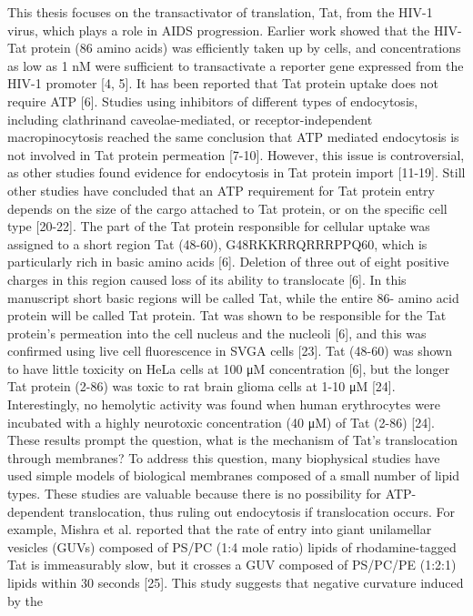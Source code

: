 This thesis focuses on 
the transactivator of translation, Tat, from the HIV-1 virus, which plays a 
role in AIDS progression. Earlier work showed that the HIV-Tat 
protein (86 amino acids) was efficiently taken up by cells, and concentrations 
as low as 1 nM were sufficient to transactivate a reporter gene expressed from 
the HIV-1 promoter [4, 5]. It has been reported that Tat protein uptake does not 
require ATP [6]. Studies using inhibitors of different types of endocytosis, 
including clathrinand caveolae-mediated, or receptor-independent 
macropinocytosis reached the same conclusion that ATP mediated endocytosis is 
not involved in Tat protein permeation [7-10]. However, this issue is 
controversial, as other studies found evidence for endocytosis in Tat protein 
import [11-19]. Still other studies have concluded that an ATP requirement for 
Tat protein entry depends on the size of the cargo attached to Tat protein, or 
on the specific cell type [20-22]. The part of the Tat protein responsible for 
cellular uptake was assigned to a short region Tat (48-60), G48RKKRRQRRRPPQ60, 
which is particularly rich in basic amino acids [6]. Deletion of three out of 
eight positive charges in this region caused loss of its ability to translocate 
[6]. In this manuscript short basic regions will be called Tat, while the 
entire 86-
amino acid protein will be called Tat protein. Tat was shown to be responsible 
for the Tat
protein’s permeation into the cell nucleus and the nucleoli [6], and this was 
confirmed using live
cell fluorescence in SVGA cells [23]. Tat (48-60) was shown to have little 
toxicity on HeLa
cells at 100 μM concentration [6], but the longer Tat protein (2-86) was toxic 
to rat brain glioma
cells at 1-10 μM [24]. Interestingly, no hemolytic activity was found when 
human erythrocytes
were incubated with a highly neurotoxic concentration (40 μM) of Tat (2-86) 
[24]. These results
prompt the question, what is the mechanism of Tat’s translocation through 
membranes?
To address this question, many biophysical studies have used simple models of
biological membranes composed of a small number of lipid types. These studies 
are valuable
because there is no possibility for ATP-dependent translocation, thus ruling 
out endocytosis if
translocation occurs. For example, Mishra et al. reported that the rate of 
entry into giant
unilamellar vesicles (GUVs) composed of PS/PC (1:4 mole ratio) lipids of 
rhodamine-tagged Tat
is immeasurably slow, but it crosses a GUV composed of PS/PC/PE (1:2:1) lipids 
within 30
seconds [25]. This study suggests that negative curvature induced by the 
